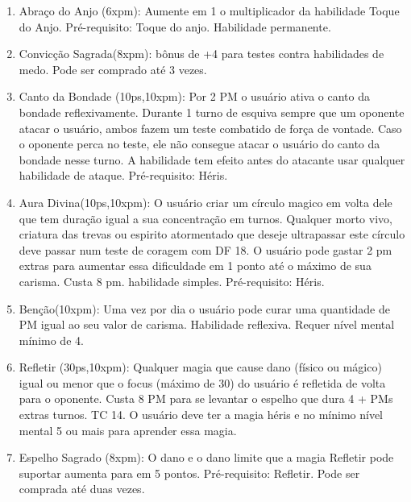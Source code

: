 \begin{enumerate}
	\item Abraço do Anjo (6xpm): Aumente em 1 o multiplicador da habilidade Toque do Anjo. Pré-requisito: Toque do anjo. Habilidade permanente.
	
	\item Convicção Sagrada(8xpm): bônus de +4 para testes contra habilidades de medo. Pode ser comprado até 3 vezes.

	\item Canto da Bondade (10ps,10xpm): Por 2 PM o usuário ativa o canto da bondade reflexivamente. Durante 1 turno de esquiva sempre que um oponente atacar o usuário, ambos fazem um teste combatido de força de vontade. Caso o oponente perca no teste, ele não consegue atacar o usuário do canto da bondade nesse turno. A habilidade tem efeito antes do atacante usar qualquer habilidade de ataque. Pré-requisito: Héris.

 		\item Aura Divina(10ps,10xpm): O usuário criar um círculo magico em volta dele que tem duração igual a sua concentração em turnos. Qualquer morto vivo, criatura das trevas ou espirito atormentado que deseje ultrapassar este círculo deve passar num teste de coragem com DF 18. O usuário pode gastar 2 pm extras para aumentar essa dificuldade em 1 ponto até o máximo de sua carisma. Custa 8 pm. habilidade simples. Pré-requisito: Héris.

\item Benção(10xpm): Uma vez por dia o usuário pode curar uma quantidade de PM igual ao seu valor de carisma. Habilidade reflexiva. Requer nível mental mínimo de 4.	


\item Refletir (30ps,10xpm): Qualquer magia que cause dano (físico ou mágico) igual ou menor que o focus (máximo de 30) do usuário é refletida de volta para o oponente. Custa 8 PM para se levantar o espelho que dura 4 + PMs extras turnos. TC 14. O usuário deve ter a magia héris e no mínimo nível mental 5 ou mais para aprender essa magia. 

	\item Espelho Sagrado (8xpm): O dano e o dano limite que a magia Refletir pode suportar aumenta para em 5 pontos. Pré-requisito: Refletir.	Pode ser comprada até duas vezes.
	

\end{enumerate}

